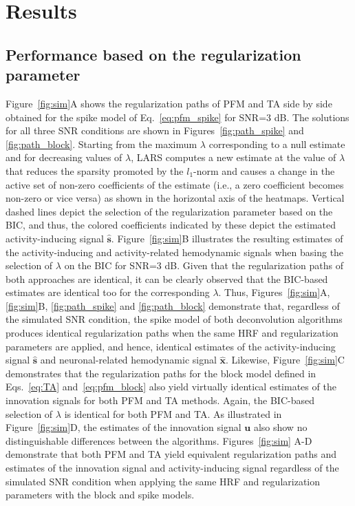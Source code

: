 
\section{Results}

\subsection{Performance based on the regularization parameter}
\label{sec:regpath}

Figure~\ref{fig:sim}A shows the regularization paths of PFM and TA side by side
obtained for the spike model of Eq.~\eqref{eq:pfm_spike} for SNR=3 dB. The
solutions for all three SNR conditions are shown in Figures~\ref{fig:path_spike}
and \ref{fig:path_block}. Starting from the maximum $\lambda$ corresponding to a
null estimate and for decreasing values of $\lambda$, LARS computes a new
estimate at the value of $\lambda$ that reduces the sparsity promoted by the
\(l_1\)-norm and causes a change in the active set of non-zero coefficients of
the estimate (i.e., a zero coefficient becomes non-zero or vice versa) as shown
in the horizontal axis of the heatmaps. Vertical dashed lines depict the
selection of the regularization parameter based on the BIC, and thus, the
colored coefficients indicated by these depict the estimated activity-inducing
signal $\mathbf{\hat{{s}}}$. Figure~\ref{fig:sim}B illustrates the resulting
estimates of the activity-inducing and activity-related hemodynamic signals when
basing the selection of $\lambda$ on the BIC for SNR=3 dB. Given that the
regularization paths of both approaches are identical, it can be clearly
observed that the BIC-based estimates are identical too for the corresponding
$\lambda$. Thus, Figures~\ref{fig:sim}A, \ref{fig:sim}B, \ref{fig:path_spike}
and \ref{fig:path_block} demonstrate that, regardless of the simulated SNR
condition, the spike model of both deconvolution algorithms produces identical
regularization paths when the same HRF and regularization parameters are
applied, and hence, identical estimates of the activity-inducing signal
$\mathbf{\hat{{s}}}$ and neuronal-related hemodynamic signal
$\mathbf{\hat{{x}}}$. Likewise, Figure~\ref{fig:sim}C demonstrates that the
regularization paths for the block model defined in Eqs.~\eqref{eq:TA}
and~\eqref{eq:pfm_block} also yield virtually identical estimates of the
innovation signals for both PFM and TA methods. Again, the BIC-based selection
of $\lambda$ is identical for both PFM and TA. As illustrated in
Figure~\ref{fig:sim}D, the estimates of the innovation signal $\mathbf{u}$ also
show no distinguishable differences between the algorithms. %
Figures~\ref{fig:sim} A-D demonstrate that both PFM and TA yield equivalent
regularization paths and estimates of the innovation signal and
activity-inducing signal regardless of the simulated SNR condition when applying
the same HRF and regularization parameters with the block and spike models.

